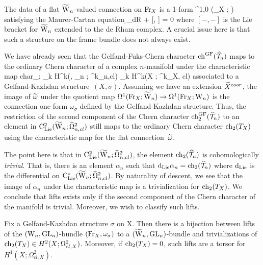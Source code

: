 \subsubsection{} \label{otherway}
 
The data of a flat $\TVect$-valued connection on $\Fr_X$ is a 1-form
\ben
\Tilde{\omega} \in \Omega^{1,0} (\Fr_X ; \TVect)
\een
satisfying the Maurer-Cartan equation
\ben
\d_{dR} \Tilde{\omega} +  [\Tilde{\omega}, \Tilde{\omega}]
= 0
\een 
where $[-,-]$ is the Lie bracket for $\TVect$ extended to the de Rham complex. 
A crucial issue here is that such a structure on the frame bundle does not always exist.

We have already seen that the Gelfand-Fuks-Chern character
$\ch^\GF (\hT_n)$ maps to the ordinary Chern character of a complex
$n$-manifold under the characteristic map 
\ben
{\rm char}_\sigma : \bigoplus_k {\rm H}^k(\Vect , \GL_n ; \hOmega^k_{n,cl}) \to
\bigoplus_k {\rm H}^k(X ; \Omega^k_{X, cl}) 
\een  
associated to a Gelfand-Kazhdan structure~$(X, \sigma)$.
Assuming we have an extension  $\Tilde{X}^{coor}$,
the image of $\Tilde{\omega}$ under the quotient map 
$\Omega^1(\Fr_X ; \TVect) \to \Omega^1(\Fr_X ; \Vect)$ 
is the connection one-form $\omega_\sigma$ defined by the Gelfand-Kazhdan structure. 
Thus, the restriction of the second component of the Chern character $\ch_2^{\GF}(\hT_n)$ to
an element in $\clie^2(\TVect ; \hOmega^2_{n,cl})$ still maps to the
ordinary Chern character $\ch_2(T_X)$ using the characteristic map for
the flat connection~$\Tilde{\omega}$. 

The point here is that in $\clie^2(\TVect ; \hOmega^2_{n,cl})$, 
the element $\ch_2(\hT_n)$ is cohomologically {\em trivial}. 
That is, there
is an element $\alpha_n$ such that $\d_{\rm Lie} \alpha_n = \ch_2(\hT_n)$ where
$\d_{\rm Lie}$ is the differential on $\clie^*(\TVect ;
\hOmega^2_{n,cl})$. By naturality of descent, we see that the image of
$\alpha_n$ under the characteristic map is a trivialization for
$\ch_2(T_X)$. We conclude that lifts exists only if the second
component of the Chern character of
the manifold is trivial. Moreover, we wish to classify such lifts.

\begin{thm}\label{extbundle} 
Fix a Gelfand-Kazhdan structure $\sigma$ on X. 
Then there is a bijection between  lifts of the $(\Vect, \GL_n)$-bundle $(\Fr_X, \omega_\sigma)$ to a $(\TVect, \GL_n)$-bundle 
and trivializations of $\ch_2(T_X) \in H^2(X ; \Omega^{2}_{cl,X})$.
Moreover, if $\ch_2(T_X) = 0$, such lifts are a torsor for $H^1(X; \Omega^{2}_{cl,X})$. 
\end{thm}

